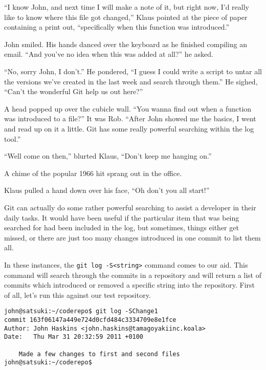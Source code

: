 \begin{trenches}
``I know John, and next time I will make a note of it, but right now, I'd really like to know where this file got changed,'' Klaus pointed at the piece of paper containing a print out, ``specifically when this function was introduced.''

John smiled.  His hands danced over the keyboard as he finished compiling an email.  ``And you've no idea when this was added at all?'' he asked.

``No, sorry John, I don't.''  He pondered, ``I guess I could write a script to untar all the versions we've created in the last week and search through them.''  He sighed, ``Can't the wonderful Git help us out here?''

A head popped up over the cubicle wall.  ``You wanna find out when a function was introduced to a file?''  It was Rob.  ``After John showed me the basics, I went and read up on it a little.  Git has some really powerful searching within the log tool.''

``Well come on then,'' blurted Klaus, ``Don't keep me hanging on.''

A chime of the popular 1966 hit sprang out in the office.

Klaus pulled a hand down over his face, ``Oh don't you all start!''
\end{trenches}

Git can actually do some rather powerful searching to assist a developer in their daily tasks.  It would have been useful if the particular item that was being searched for had been included in the log, but sometimes, things either get missed, or there are just too many changes introduced in one commit to list them all.

In these instances, the \texttt{git log -S<string>} command comes to our aid.  This command will search through the commits in a repository and will return a list of commits which introduced or removed a specific string into the repository.  First of all, let's run this against our test repository.

\begin{Verbatim}[frame=leftline,framerule=1mm,fontsize=\relsize{-3}] 
john@satsuki:~/coderepo$ git log -SChange1
commit 163f06147a449e724d0cfd484c3334709e8e1fce
Author: John Haskins <john.haskins@tamagoyakiinc.koala>
Date:   Thu Mar 31 20:32:59 2011 +0100

    Made a few changes to first and second files
john@satsuki:~/coderepo$ 
\end{Verbatim}

